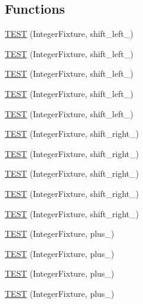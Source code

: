 \subsection*{Functions}
\begin{DoxyCompactItemize}
\item 
\hyperlink{TestInteger_8c_09_09_a79d81b60294fe0e14df2ff9952a838ed}{T\-E\-S\-T} (Integer\-Fixture, shift\-\_\-left\-\_)
\item 
\hyperlink{TestInteger_8c_09_09_af5cb52be897b601f5045042702480f90}{T\-E\-S\-T} (Integer\-Fixture, shift\-\_\-left\-\_)
\item 
\hyperlink{TestInteger_8c_09_09_a27501b134bc591f80c7c16ebd128e7c8}{T\-E\-S\-T} (Integer\-Fixture, shift\-\_\-left\-\_)
\item 
\hyperlink{TestInteger_8c_09_09_a1d66547a8c4c2b887002cd116d077c79}{T\-E\-S\-T} (Integer\-Fixture, shift\-\_\-left\-\_)
\item 
\hyperlink{TestInteger_8c_09_09_a059132a504edf316d612e9322cf8cd0e}{T\-E\-S\-T} (Integer\-Fixture, shift\-\_\-left\-\_)
\item 
\hyperlink{TestInteger_8c_09_09_a5d8a5ee89ce8f1537415cc6399e7613c}{T\-E\-S\-T} (Integer\-Fixture, shift\-\_\-right\-\_)
\item 
\hyperlink{TestInteger_8c_09_09_ae0bf53c037cf11f0ff338500f32485c1}{T\-E\-S\-T} (Integer\-Fixture, shift\-\_\-right\-\_)
\item 
\hyperlink{TestInteger_8c_09_09_aed4ef5d1540f90b4f019bf07b4a54c12}{T\-E\-S\-T} (Integer\-Fixture, shift\-\_\-right\-\_)
\item 
\hyperlink{TestInteger_8c_09_09_a8929353517b37ff00a201b58f3a96c3a}{T\-E\-S\-T} (Integer\-Fixture, shift\-\_\-right\-\_)
\item 
\hyperlink{TestInteger_8c_09_09_a99e26f83d1b84db87726dce6446a18b0}{T\-E\-S\-T} (Integer\-Fixture, shift\-\_\-right\-\_)
\item 
\hyperlink{TestInteger_8c_09_09_ab1d7673a4669f1d3502fdc8c625a6475}{T\-E\-S\-T} (Integer\-Fixture, plus\-\_)
\item 
\hyperlink{TestInteger_8c_09_09_a7482235e72b1dc7017e23924624d77bf}{T\-E\-S\-T} (Integer\-Fixture, plus\-\_)
\item 
\hyperlink{TestInteger_8c_09_09_ade171a7e068d0c882d9e8d00af506a19}{T\-E\-S\-T} (Integer\-Fixture, plus\-\_)
\item 
\hyperlink{TestInteger_8c_09_09_a8c2165606d4314585e2fb105ffc04492}{T\-E\-S\-T} (Integer\-Fixture, plus\-\_)
\item 

\end{DoxyCompactItemize}

